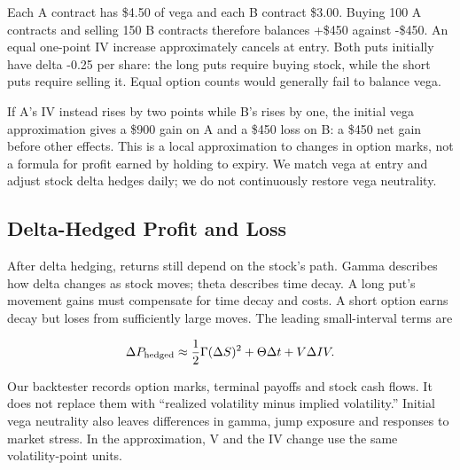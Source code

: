 Each A contract has \$4.50 of vega and each B contract \$3.00. Buying 100 A contracts and selling 150 B contracts therefore balances +\$450 against -\$450. An equal one-point IV increase approximately cancels at entry. Both puts initially have delta -0.25 per share: the long puts require buying stock, while the short puts require selling it. Equal option counts would generally fail to balance vega.


If A's IV instead rises by two points while B's rises by one, the initial vega approximation gives a \$900 gain on A and a \$450 loss on B: a \$450 net gain before other effects. This is a local approximation to changes in option marks, not a formula for profit earned by holding to expiry. We match vega at entry and adjust stock delta hedges daily; we do not continuously restore vega neutrality.


\subsection*{Delta-Hedged Profit and Loss}

After delta hedging, returns still depend on the stock's path. Gamma describes how delta changes as stock moves; theta describes time decay. A long put's movement gains must compensate for time decay and costs. A short option earns decay but loses from sufficiently large moves. The leading small-interval terms are


\begin{equation*}\Delta P_{\rm hedged}\approx\frac{1}{2}\Gamma(\Delta S)^2+\Theta\Delta t+V\Delta IV.\end{equation*}

Our backtester records option marks, terminal payoffs and stock cash flows. It does not replace them with ``realized volatility minus implied volatility.'' Initial vega neutrality also leaves differences in gamma, jump exposure and responses to market stress. In the approximation, V and the IV change use the same volatility-point units.
